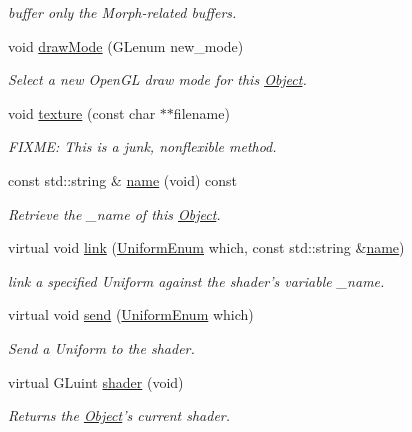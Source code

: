 \begin{DoxyCompactItemize}
\begin{DoxyCompactList}\small\item\em buffer only the Morph-\/related buffers. \end{DoxyCompactList}\item 
void \hyperlink{class_object_adafdf22583b051b4c61c8eb725fb07d5}{draw\-Mode} (G\-Lenum new\-\_\-mode)
\begin{DoxyCompactList}\small\item\em Select a new Open\-G\-L draw mode for this \hyperlink{class_object}{Object}. \end{DoxyCompactList}\item 
void \hyperlink{class_object_afebb27ddb10daed8e2c5085b76cbc500}{texture} (const char $\ast$$\ast$filename)
\begin{DoxyCompactList}\small\item\em F\-I\-X\-M\-E\-: This is a junk, nonflexible method. \end{DoxyCompactList}\item 
const std\-::string \& \hyperlink{class_object_aafd766fce2598f718cac97a3ac731706}{name} (void) const 
\begin{DoxyCompactList}\small\item\em Retrieve the \-\_\-name of this \hyperlink{class_object}{Object}. \end{DoxyCompactList}\item 
virtual void \hyperlink{class_object_a11d6063c580331d6af59c8d71b7f3e9f}{link} (\hyperlink{class_object_a79b74057dbc5182b85c9c3ba8480fcf2}{Uniform\-Enum} which, const std\-::string \&\hyperlink{class_object_aafd766fce2598f718cac97a3ac731706}{name})
\begin{DoxyCompactList}\small\item\em link a specified Uniform against the shader's variable \-\_\-name. \end{DoxyCompactList}\item 
virtual void \hyperlink{class_object_a34258ee199342d785c29d18c49d54e71}{send} (\hyperlink{class_object_a79b74057dbc5182b85c9c3ba8480fcf2}{Uniform\-Enum} which)
\begin{DoxyCompactList}\small\item\em Send a Uniform to the shader. \end{DoxyCompactList}\item 
virtual G\-Luint \hyperlink{class_object_a459489106838a1e3a8dbbd13045cd523}{shader} (void)
\begin{DoxyCompactList}\small\item\em Returns the \hyperlink{class_object}{Object}'s current shader. \end{DoxyCompactList}\item 
$$
\end{DoxyCompactItemize}
